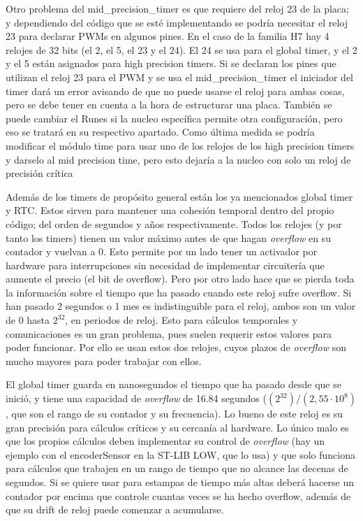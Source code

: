 \documentclass{report}
\begin{document}
Otro problema del mid\_precision\_timer es que requiere del reloj 23 de la placa; y dependiendo del código que se esté implementando se podría necesitar el reloj 23 para declarar PWMs en algunos pines. En el caso de la familia H7 hay 4 relojes de 32 bits (el 2, el 5, el 23 y el 24). El 24 se usa para el global timer, y el 2 y el 5 están asignados para high precision timers. Si se declaran los pines que utilizan el reloj 23 para el PWM y se usa el mid\_precision\_timer el iniciador del timer dará un error avisando de que no puede usarse el reloj para ambas cosas, pero se debe tener en cuenta a la hora de estructurar una placa. También se puede cambiar el Runes si la nucleo específica permite otra configuración, pero eso se tratará en su respectivo apartado. Como última medida se podría modificar el módulo time para usar uno de los relojes de los high precision timers y darselo al mid precision time, pero esto dejaría a la nucleo con solo un reloj de precisión crítica \par \vspace{0.3 cm} 
Además de los timers de propósito general están los ya mencionados global timer y RTC. Estos sirven para mantener una cohesión temporal dentro del propio código; del orden de segundos y años respectivamente. Todos los relojes (y por tanto los timers) tienen un valor máximo antes de que hagan \textit{overflow} en su contador y vuelvan a 0. Esto permite por un lado tener un activador por hardware para interrupciones sin necesidad de implementar circuitería que aumente el precio (el bit de overflow). Pero por otro lado hace que se pierda toda la información sobre el tiempo que ha pasado cuando este reloj sufre overflow. Si han pasado 2 segundos o 1 mes es indistinguible para el reloj, ambos son un valor de 0 hasta $2^{32}$, en periodos de reloj. Esto para cálculos temporales y comunicaciones es un gran problema, pues suelen requerir estos valores para poder funcionar. Por ello se usan estos dos relojes, cuyos plazos de \textit{overflow} son mucho mayores para poder trabajar con ellos. \par 
El global timer guarda en nanosegundos el tiempo que ha pasado desde que se inició, y tiene una capacidad de \textit{overflow} de 16.84 segundos ($(2^{32})/(2,55·10^8)$, que son el rango de su contador y su frecuencia). Lo bueno de este reloj es su gran precisión para cálculos críticos y su cercanía al hardware. Lo único malo es que los propios cálculos deben implementar su control de \textit{overflow} (hay un ejemplo con el encoderSensor en la ST-LIB LOW, que lo usa) y que solo funciona para cálculos que trabajen en un rango de tiempo que no alcance las decenas de segundos. Si se quiere usar para estampas de tiempo más altas deberá hacerse un contador por encima que controle cuantas veces se ha hecho overflow, además de que su drift de reloj puede comenzar a acumularse. \par \vspace{0.3cm}
\end{document}
